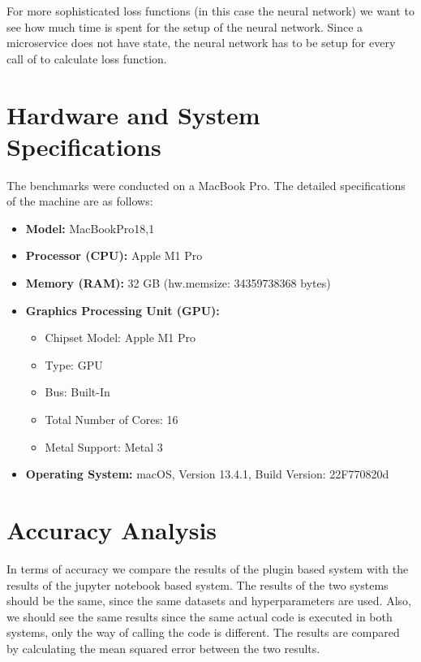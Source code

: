 \documentclass[
  a4paper,  %
  twoside,  %
  bibliography=totoc,
  headsepline,
  cleardoublepage=empty,
  parskip=half,
  draft=false
]{scrbook}
\begin{document}
For more sophisticated loss functions (in this case the neural network) we want to see how much time is spent for the setup of the neural network.
Since a microservice does not have state, the neural network has to be setup for every call of to calculate loss function.

\section{Hardware and System Specifications}

The benchmarks were conducted on a MacBook Pro. The detailed specifications of the machine are as follows:

\begin{itemize}
    \item \textbf{Model:} MacBookPro18,1
    \item \textbf{Processor (CPU):} Apple M1 Pro
    \item \textbf{Memory (RAM):} 32 GB (hw.memsize: 34359738368 bytes)
    \item \textbf{Graphics Processing Unit (GPU):}
    \begin{itemize}
        \item Chipset Model: Apple M1 Pro
        \item Type: GPU
        \item Bus: Built-In
        \item Total Number of Cores: 16
        \item Metal Support: Metal 3
    \end{itemize}
    \item \textbf{Operating System:} macOS, Version 13.4.1, Build Version: 22F770820d
\end{itemize}


\section{Accuracy Analysis}
\label{sec:accuracyAnalysis}
In terms of accuracy we compare the results of the plugin based system with the results of the jupyter notebook based system.
The results of the two systems should be the same, since the same datasets and hyperparameters are used.
Also, we should see the same results since the same actual code is executed in both systems, only the way of calling the code is different.
The results are compared by calculating the mean squared error between the two results.
\end{document}
